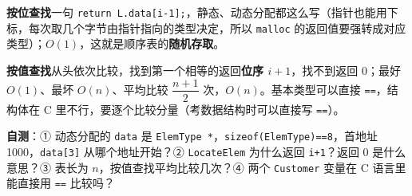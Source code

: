 \documentclass[10.5pt,a4paper,oneside]{article}
\begin{document}
\begin{summarybox}

\textbf{按位查找}一句
\texttt{return\ L.data{[}i-1{]};}，静态、动态分配都这么写（指针也能用下标，每次取几个字节由指针指向的类型决定，所以
\texttt{malloc}
的返回值要强转成对应类型）；\(O(1)\)，这就是顺序表的\textbf{随机存取}。

\textbf{按值查找}从头依次比较，找到第一个相等的返回\textbf{位序
\(i+1\)}，找不到返回 0；最好 \(O(1)\)、最坏 \(O(n)\)、平均比较
\(\dfrac{n+1}{2}\) 次，\(O(n)\)。基本类型可以直接 \texttt{==}，结构体在
C 里不行，要逐个比较分量（考数据结构时可以直接写 \texttt{==}）。

\textbf{自测}：① 动态分配的 \texttt{data} 是
\texttt{ElemType\ *}，\texttt{sizeof(ElemType)==8}，首地址
1000，\texttt{data{[}3{]}} 从哪个地址开始？② \texttt{LocateElem}
为什么返回 \texttt{i+1}？返回 0 是什么意思？③ 表长为
\(n\)，按值查找平均比较几次？④ 两个 \texttt{Customer} 变量在 C
语言里能直接用 \texttt{==} 比较吗？

\end{summarybox}
\end{document}
